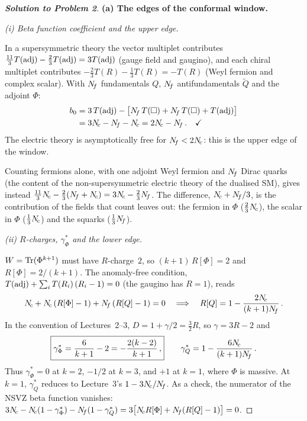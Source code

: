 \documentclass[11pt,a4paper]{article}
\begin{document}
\begin{proof}[\textbf{Solution to Problem 2}]

\textbf{(a) The edges of the conformal window.}

\textit{(i) Beta function coefficient and the upper edge.}

In a supersymmetric theory the vector multiplet contributes
$\tfrac{11}{3}T(\mathrm{adj}) - \tfrac{2}{3}T(\mathrm{adj}) = 3T(\mathrm{adj})$ (gauge field and
gaugino), and each chiral multiplet contributes
$-\tfrac{2}{3}T(R) - \tfrac{1}{3}T(R) = -T(R)$ (Weyl fermion and
complex scalar).  With $N_{\!f}$ fundamentals $Q$, $N_{\!f}$ antifundamentals
$\widetilde{Q}$ and the adjoint $\Phi$:
\begin{align*}
  b_0 &= 3\,T(\mathrm{adj}) - \bigl[N_{\!f}\,T(\square) + N_{\!f}\,T(\square) + T(\mathrm{adj})\bigr] \\
  &= 3N_{\!c} - N_{\!f} - N_{\!c}
  = 2N_{\!c} - N_{\!f}\,.
  \quad\checkmark
\end{align*}
The electric theory is asymptotically free for $N_{\!f} < 2N_{\!c}$: this is
the upper edge of the window.

Counting fermions alone, with one adjoint Weyl fermion and $N_{\!f}$
Dirac quarks (the content of the non-supersymmetric electric theory of
the dualised SM), gives instead
$\tfrac{11}{3}N_{\!c} - \tfrac{2}{3}(N_{\!f} + N_{\!c}) = 3N_{\!c} - \tfrac{2}{3}N_{\!f}$.
The difference, $N_{\!c} + N_{\!f}/3$, is the contribution of the fields that
count leaves out: the fermion in $\Phi$ ($\tfrac{2}{3}N_{\!c}$), the scalar
in $\Phi$ ($\tfrac{1}{3}N_{\!c}$) and the squarks ($\tfrac{1}{3}N_{\!f}$).

\textit{(ii) $R$-charges, $\gamma_\Phi^*$ and the lower edge.}

$W = \mathrm{Tr}(\Phi^{k+1})$ must have $R$-charge~$2$, so
$(k+1)\,R[\Phi] = 2$ and $R[\Phi] = 2/(k+1)$.  The anomaly-free
condition, $T(\mathrm{adj}) + \sum_i T(R_i)\,(R_i - 1) = 0$ (the gaugino
has $R = 1$), reads
\[
  N_{\!c} + N_{\!c}\,(R[\Phi] - 1) + N_{\!f}\,(R[Q] - 1) = 0
  \quad\Longrightarrow\quad
  R[Q] = 1 - \frac{2N_{\!c}}{(k+1)N_{\!f}}\,.
\]
In the convention of Lectures~2--3, $D = 1 + \gamma/2 = \tfrac{3}{2}R$,
so $\gamma = 3R - 2$ and
\[
  \boxed{\gamma_\Phi^* = \frac{6}{k+1} - 2 = -\frac{2(k-2)}{k+1}\,,}
  \qquad
  \gamma_Q^* = 1 - \frac{6N_{\!c}}{(k+1)N_{\!f}}\,.
\]
Thus $\gamma_\Phi^* = 0$ at $k = 2$, $-1/2$ at $k = 3$, and $+1$ at
$k = 1$, where $\Phi$ is massive.  At $k = 1$, $\gamma_Q^*$ reduces to
Lecture~3's $1 - 3N_{\!c}/N_{\!f}$.  As a check, the numerator of the NSVZ beta
function vanishes:
$3N_{\!c} - N_{\!c}(1 - \gamma_\Phi^*) - N_{\!f}(1 - \gamma_Q^*)
= 3\bigl[N_{\!c} R[\Phi] + N_{\!f}(R[Q] - 1)\bigr] = 0$.


\end{proof}
\end{document}

